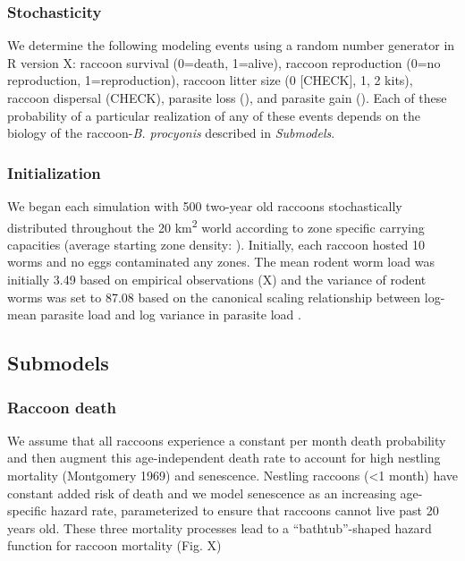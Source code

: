 \documentclass[11pt]{article}
\begin{document}
\subsubsection{Stochasticity}

We determine the following modeling events using a random number generator in R version X: raccoon survival (0=death, 1=alive), raccoon reproduction (0=no reproduction, 1=reproduction), raccoon litter size (0 [CHECK], 1, 2 kits), raccoon dispersal (CHECK), parasite loss (), and parasite gain ().  Each of these probability of a particular realization of any of these events depends on the biology of the raccoon-\emph{B. procyonis} described in \emph{Submodels}.

\subsubsection{Initialization}

We began each simulation with 500 two-year old raccoons stochastically
distributed throughout the 20 km\textsuperscript{2} world according to
zone specific carrying capacities (average starting zone density: ).
Initially, each raccoon hosted 10 worms and no eggs contaminated any
zones. The mean rodent worm load was initially 3.49 based on
empirical observations (X) and the variance of rodent worms
was set to 87.08 based on the canonical scaling relationship between
log-mean parasite load and log variance in parasite load \citep{Shaw1995}.

\subsection{Submodels}

\subsubsection{Raccoon death}

We assume that all raccoons experience a constant per month death
probability and then augment this age-independent death rate to account
for high nestling mortality (Montgomery 1969) and senescence. Nestling
raccoons (\textless{}1 month) have constant added risk of death and we
model senescence as an increasing age-specific hazard rate,
parameterized to ensure that raccoons cannot live past 20 years old.
These three mortality processes lead to a ``bathtub''-shaped hazard
function for raccoon mortality (Fig. X)
\end{document}
